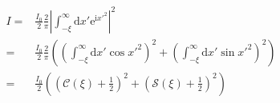 \documentclass[10pt,fleqn]{article}
\newcommand{\ud}{\mathrm{d}}
\newcommand{\ue}{\mathrm{e}}
\newcommand{\ui}{\mathrm{i}}
\newcommand{\eqar}[1]
{
  \begin{align*}
    #1
  \end{align*}
}
\newcommand{\paren}[1]{{\left({#1}\right)}}
\newcommand{\abs}[1]{{\left|{#1}\right|}}
\begin{document}
\subsection{}
\eqar{
  I=&\frac{I_0}{2}\frac{2}{\pi}\abs{\int_{-\xi}^\infty\ud x'\ue^{\ui x'^2}}^2\\
  =&\frac{I_0}{2}\frac{2}{\pi}\paren{
    \paren{\int_{-\xi}^\infty\ud x'\cos x'^2}^2+
    \paren{\int_{-\xi}^\infty\ud x'\sin x'^2}^2
  }\\
  =&\frac{I_0}{2}\paren{
    \paren{\mathcal{C}\paren{\xi}+\frac12}^2+
    \paren{\mathcal{S}\paren{\xi}+\frac12}^2
  }
}
\end{document}
